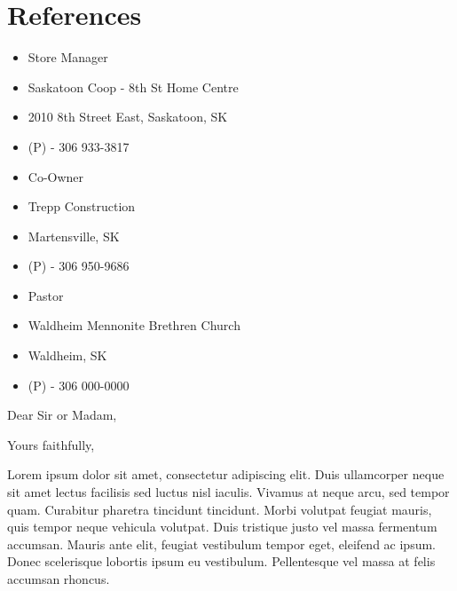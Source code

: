 \documentclass[11pt,letterpaper,sans]{moderncv}        %
\begin{document}
\section{References}
{
  \begin{itemize}
    \item Store Manager
    \item Saskatoon Coop - 8th St Home Centre
    \item 2010 8th Street East, Saskatoon, SK
    \item (P) - 306 933-3817
  \end{itemize}
}

{
  \begin{itemize}
    \item Co-Owner
    \item Trepp Construction
    \item Martensville, SK
    \item (P) - 306 950-9686
  \end{itemize}
}

{
  \begin{itemize}
    \item Pastor
    \item Waldheim Mennonite Brethren Church
    \item Waldheim, SK
    \item (P) - 306 000-0000
  \end{itemize}
}


\clearpage
\date{January 01, 1984}
\opening{Dear Sir or Madam,}
\closing{Yours faithfully,}
\makelettertitle

Lorem ipsum dolor sit amet, consectetur adipiscing elit. Duis ullamcorper neque sit amet lectus facilisis sed luctus nisl iaculis. Vivamus at neque arcu, sed tempor quam. Curabitur pharetra tincidunt tincidunt. Morbi volutpat feugiat mauris, quis tempor neque vehicula volutpat. Duis tristique justo vel massa fermentum accumsan. Mauris ante elit, feugiat vestibulum tempor eget, eleifend ac ipsum. Donec scelerisque lobortis ipsum eu vestibulum. Pellentesque vel massa at felis accumsan rhoncus.
\end{document}
